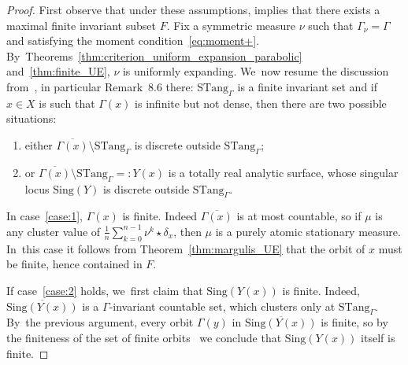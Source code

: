 \documentclass[11pt]{article}
\newcommand{\unsur}[1]{\frac{1}{#1}}
\newcommand{\Sing}{{\mathrm{Sing}}}
\newcommand{\STang}{{\mathrm{STang}}}
\theoremstyle{plain}
\theoremstyle{definition}
\numberwithin{equation}{section}
\begin{document}
\begin{proof}
First observe that under these assumptions, \cite[Th.\,C]{finite_orbits} implies
that there exists a maximal finite invariant subset $F$.
Fix a symmetric measure $\nu$ such that $\Gamma_\nu = \Gamma$ and satisfying the
moment condition~\eqref{eq:moment+}. By~Theorems~\ref{thm:criterion_uniform_expansion_parabolic} and~\ref{thm:finite_UE},
$\nu$ is uniformly expanding. We~now resume the discussion from~\cite[\S 8]{invariant}, in particular Remark~8.6 there: $\STang_\Gamma$ is a finite invariant set and if $x\in X$ is such that $\Gamma(x)$ is infinite
but not dense, then there are two possible situations:
\begin{enumerate}
\item\label{case:1} either $\overline{\Gamma(x)}\setminus \STang_\Gamma$ is discrete outside $\STang_\Gamma$;
\item\label{case:2} or $\overline{\Gamma(x)}\setminus \STang_\Gamma =: Y(x)$ is a totally real analytic surface, whose singular locus $\Sing(Y)$ is discrete outside $\STang_\Gamma$.
\end{enumerate}

In case~\eqref{case:1}, $\Gamma(x)$ is finite.
Indeed $\overline {\Gamma(x)}$ is at most countable,
so if $\mu$ is any cluster value of
$\unsur{n}\sum_{k=0}^{n-1} \nu^k\star\delta_x$, then $\mu$ is a purely atomic
stationary measure. In~this case it follows from Theorem~\ref{thm:margulis_UE} that
the orbit of $x$ must be finite, hence contained in $F$.

If case~\eqref{case:2} holds, we~first claim that $\Sing(Y(x))$ is finite.
Indeed, $\overline {\Sing(Y(x))}$ is a $\Gamma$-invariant countable set, which clusters only at
$\STang_\Gamma$. By~the previous argument, every orbit $\Gamma(y)$ in $\overline {\Sing(Y(x))}$ is finite, so by the
finiteness of the set of finite orbits~\cite[Th.\,C]{finite_orbits} we conclude that
$\Sing(Y(x))$ itself is finite.


\end{proof}
\end{document}
